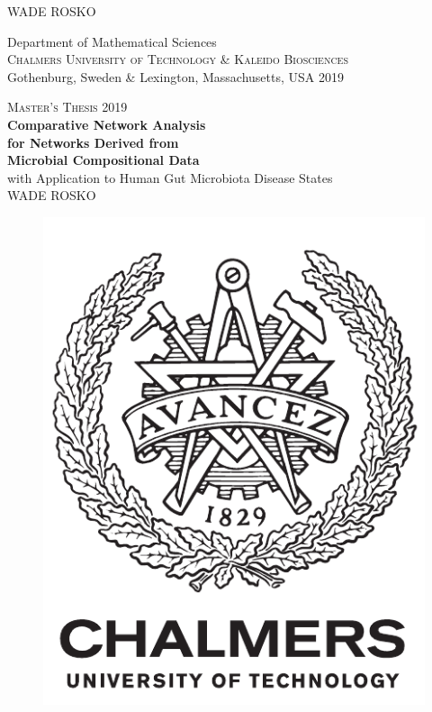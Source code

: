 \begin{titlepage}
{\Large WADE ROSKO} \setlength{\parskip}{2.4cm}

Department of Mathematical Sciences \\
\textsc{Chalmers University of Technology \& Kaleido Biosciences} \\
 Gothenburg, Sweden \& Lexington, Massachusetts, USA 2019

\renewcommand{\familydefault}{\rmdefault} \normalfont %
\end{titlepage}


\newpage
\restoregeometry
\thispagestyle{empty}
\mbox{}


\newpage
\thispagestyle{empty}
\begin{center}
	\textsc{\large Master's Thesis 2019}\\[4cm]		%
	\textbf{\Large Comparative Network Analysis \\ for Networks Derived from \\ Microbial Compositional Data} \\[1cm]
	{\large with Application to Human Gut Microbiota Disease States}\\[1cm]
	{\large WADE ROSKO}
	
	\vfill	
	\begin{figure}[H]
	\centering
	\includegraphics[width=0.2\pdfpagewidth]{figure/auxiliary/logo_eng.pdf} \\	
	\end{figure}	\vspace{5mm}	
	

\end{center}
